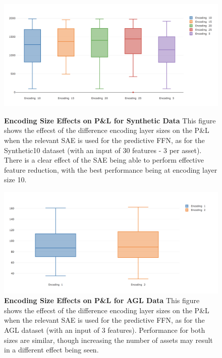 \documentclass[a4paper,11pt,oneside]{article}
\theoremstyle{plain}
\theoremstyle{definition}
\begin{document}
\begin{figure}[H]
	\centering
	\begin{minipage}{0.45\textwidth}
		\centering \includegraphics[scale=0.3]{images/iteration_five/it5_encoding_size_synthetic10.png}
		\caption{\textbf{Encoding Size Effects on P\&L for Synthetic Data} 
			\newline This figure shows the effecst of the difference encoding layer sizes on the P\&L when the relevant SAE is used for the predictive FFN, as for the Synthetic10 dataset (with an input of 30 features - 3 per asset). There is a clear effect of the SAE being able to perform effective feature reduction, with the best performance being at encoding layer size 10.}
		\label{figure-it5_encoding_size_synthetic10}
	\end{minipage}\hfill
	\begin{minipage}{0.45\textwidth}
		\centering \includegraphics[scale=0.3]{images/iteration_five/it5_encoding_size_agl.png}
		\caption{\textbf{Encoding Size Effects on P\&L for AGL Data} 
			\newline This figure shows the effecst of the difference encoding layer sizes on the P\&L when the relevant SAE is used for the predictive FFN, as for the AGL dataset (with an input of 3 features). Performance for both sizes are similar, though increasing the number of assets may result in a different effect being seen.}
		\label{figure-it5_encoding_size_agl}
	\end{minipage}
\end{figure}
\end{document}

